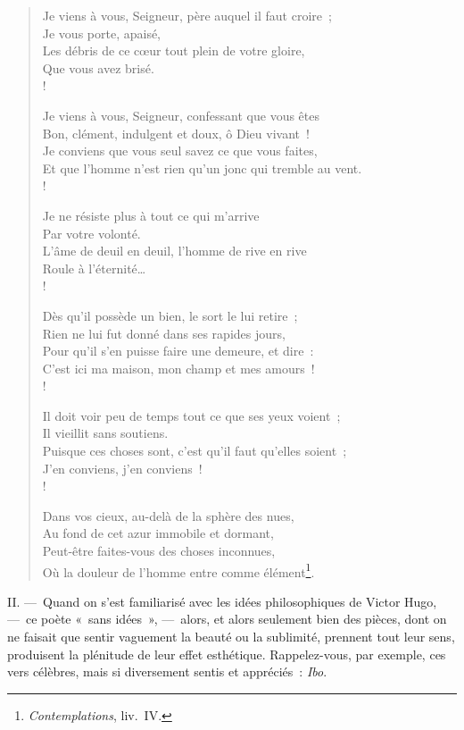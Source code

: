 \documentclass[french,twoside]{book} %
\begin{document}
\begin{verse}
Je viens à vous, Seigneur, père auquel il faut croire ;\\
Je vous porte, apaisé,\\
Les débris de ce cœur tout plein de votre gloire,\\
Que vous avez brisé.\\!

Je viens à vous, Seigneur, confessant que vous êtes\\
Bon, clément, indulgent et doux, ô Dieu vivant !\\
Je conviens que vous seul savez ce que vous faites,\\
Et que l’homme n’est rien qu’un jonc qui tremble au vent.\\!

Je ne résiste plus à tout ce qui m’arrive\\
Par votre volonté.\\
L’âme de deuil en deuil, l’homme de rive en rive\\
Roule à l’éternité…\\!

Dès qu’il possède un bien, le sort le lui retire ;\\
Rien ne lui fut donné dans ses rapides jours,\\
Pour qu’il s’en puisse faire une demeure, et dire :\\
C’est ici ma maison, mon champ et mes amours !\\!

Il doit voir peu de temps tout ce que ses yeux voient ;\\
Il vieillit sans soutiens.\\
Puisque ces choses sont, c’est qu’il faut qu’elles soient ;\\
J’en conviens, j’en conviens !\\!

Dans vos cieux, au-delà de la sphère des nues,\\
Au fond de cet azur immobile et dormant,\\
Peut-être faites-vous des choses inconnues,\\
Où la douleur de l’homme entre comme élément\footnote{\emph{Contemplations}, liv. IV.}.\\
\end{verse}

\noindent II. — Quand on s’est familiarisé avec les idées philosophiques de Victor Hugo, — ce poète « sans idées », — alors, et alors seulement bien des pièces, dont on ne faisait que sentir vaguement la beauté ou la sublimité, prennent tout leur sens, produisent la plénitude de leur effet esthétique. Rappelez-vous, par exemple, ces vers célèbres, mais si diversement sentis et appréciés : \emph{Ibo}.\par
\end{document}
